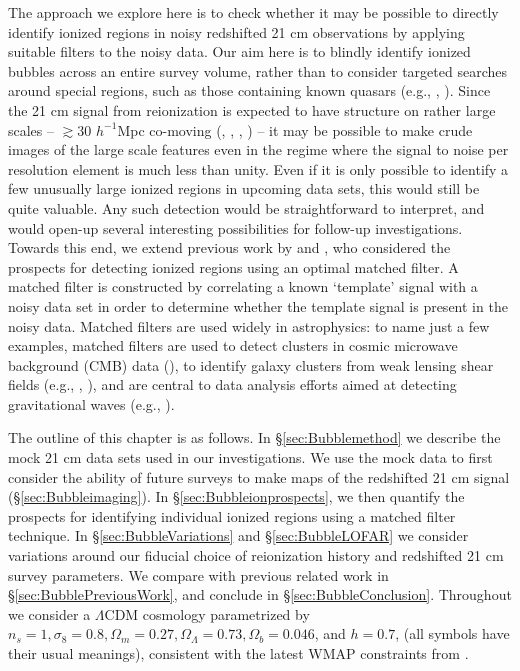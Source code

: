 The approach we explore here is to check whether it may be possible to directly identify ionized regions in
noisy redshifted 21 cm observations by applying suitable filters to the noisy data. Our aim here is to blindly identify ionized bubbles across an entire survey volume, rather than to consider targeted searches around special
regions, such as those containing known quasars (e.g., \citealt{Wyithe:2004ta}, \citealt{Friedrich:2012fy}).
Since the 21 cm signal from reionization is
expected to have structure on rather large scales -- $\gtrsim 30$ $h^{-1}$Mpc co-moving (\citealt{Furlanetto:2004nh}, \citealt{Iliev:2005sz}, \citealt{Zahn:2006sg}, \citealt{McQuinn:2006et}) -- it may be possible to make
crude images of the large scale features even in the regime where the signal to noise per resolution element is much less
than unity.  Even if it is only possible to identify a few unusually large ionized regions in upcoming data sets, this would
still be quite valuable. Any such detection would be straightforward to interpret, and would open-up several interesting
possibilities for follow-up investigations.
Towards this end, we extend previous work by \cite{Datta:2007nj} and \cite{Datta:2008ry}, who considered the prospects for detecting
ionized regions using an optimal matched filter. A matched filter is constructed by correlating a known `template' signal with a
noisy data set in order to determine whether the template signal is present in the noisy data. Matched filters are used
widely in astrophysics: to name just a few examples, matched filters are used to detect clusters in cosmic microwave background (CMB) data (\citealt{Haehnelt:1995dg}), to identify galaxy clusters from weak lensing shear fields (e.g., \citealt{Hennawi:2004ai}, \citealt{Marian:2008fd}), 
and are central to data analysis efforts aimed at detecting gravitational waves (e.g., \citealt{Owen:1998dk}).

The outline of this chapter is as follows. In \S\ref{sec:Bubblemethod} we describe the mock 21 cm data sets used in our investigations.
We use the mock data to first consider the ability of future surveys
to make maps of the redshifted 21 cm signal (\S\ref{sec:Bubbleimaging}). In \S\ref{sec:Bubbleionprospects}, 
we then quantify the prospects for identifying individual ionized regions using
a matched filter technique. In \S\ref{sec:BubbleVariations} and \S\ref{sec:BubbleLOFAR} we
consider variations around our fiducial choice of reionization history and redshifted
21 cm survey parameters. We compare with previous related work in \S\ref{sec:BubblePreviousWork},
and conclude in \S \ref{sec:BubbleConclusion}.
Throughout we consider a $\Lambda$CDM cosmology
parametrized by $n_s =1, \sigma_8 = 0.8, \Omega_m = 0.27,
\Omega_\Lambda = 0.73, \Omega_b = 0.046$, and $h=0.7$, (all symbols
have their usual meanings), consistent with the latest WMAP
constraints from \cite{Komatsu:2010fb}.


